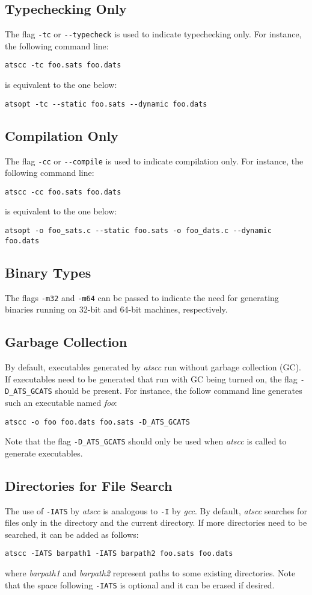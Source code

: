 \subsection{Typechecking Only}
The flag \verb`-tc` or \verb`--typecheck` is used to indicate typechecking
only. For instance, the following command line:
\begin{verbatim}
atscc -tc foo.sats foo.dats
\end{verbatim}
is equivalent to the one below:
\begin{verbatim}
atsopt -tc --static foo.sats --dynamic foo.dats
\end{verbatim}

\subsection{Compilation Only}
The flag \verb`-cc` or \verb`--compile` is used to indicate compilation only.
For instance, the following command line:
\begin{verbatim}
atscc -cc foo.sats foo.dats
\end{verbatim}
is equivalent to the one below:
\begin{verbatim}
atsopt -o foo_sats.c --static foo.sats -o foo_dats.c --dynamic foo.dats
\end{verbatim}

\subsection{Binary Types}
The flags \verb`-m32` and \verb`-m64` can be passed to indicate the need
for generating binaries running on 32-bit and 64-bit machines, respectively.

\subsection{Garbage Collection}
By default, executables generated by {\it atscc} run without garbage
collection (GC). If executables need to be generated that run with GC being
turned on, the flag \verb`-D_ATS_GCATS` should be present.  For instance,
the follow command line generates such an executable named {\it foo}:
\begin{verbatim}
atscc -o foo foo.dats foo.sats -D_ATS_GCATS
\end{verbatim}
Note that the flag \verb`-D_ATS_GCATS` should only be used when {\it atscc}
is called to generate executables.

\subsection{Directories for File Search}
The use of \verb`-IATS` by {\it atscc} is analogous to \verb`-I` by {\it gcc}.
By default, {\it atscc} searches for files only in the directory \ATSHOME
and the current directory. If more directories need to be searched, it can
be added as follows:
\begin{verbatim}
atscc -IATS barpath1 -IATS barpath2 foo.sats foo.dats
\end{verbatim}
where {\it barpath1} and {\it barpath2} represent paths to some existing directories.
Note that the space following \verb`-IATS` is optional and it can be erased
if desired.

